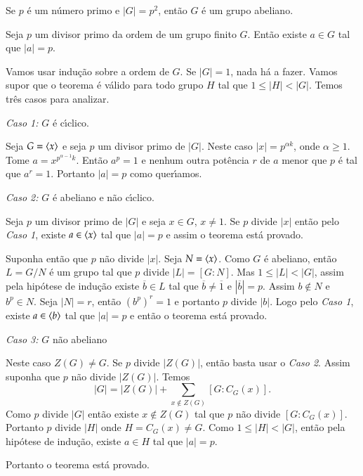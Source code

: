 \begin{corolario}
	Se $p$ \'e um n\'umero primo e $|G| = p^2$, ent\~ao $G$ \'e um grupo abeliano.
\end{corolario}

\begin{teorema}
	Seja $p$ um divisor primo da ordem de um grupo finito $G$. Ent\~ao existe $a \in G$ tal que $|a| = p$.
\end{teorema}
\begin{prova}
	Vamos usar indu\c{c}\~ao sobre a ordem de $G$. Se $|G| = 1$, nada h\'a a fazer. Vamos supor que o teorema \'e v\'alido para todo grupo $H$ tal que $1 \le |H| < |G|$. Temos tr\^es casos para analizar.
	
	\noindent \textit{Caso 1:} $G$ \'e c{\'\i}clico.

	Seja $G = \langle{x}\rangle$  e seja $p$ um divisor primo de $|G|$. Neste caso $|x| = p^{\alpha k}$, onde $\alpha \ge 1$. Tome $a = x^{p^{\alpha - 1}k}$. Ent\~ao $a^p = 1$ e nenhum outra pot\^encia $r$ de $a$ menor que $p$ \'e tal que $a^r = 1$. Portanto $|a| = p$ como quer{\'\i}amos.

	\noindent \textit{Caso 2:} $G$ \'e abeliano e n\~ao c{\'\i}clico.

	Seja $p$ um divisor primo de $|G|$ e seja $x \in G$, $x \ne 1$. Se $p$ divide $|x|$ ent\~ao pelo \textit{Caso 1}, existe $a \in \langle{x}\rangle$ tal que $|a| = p$ e assim o teorema est\'a provado.

	Suponha ent\~ao que $p$ n\~ao divide $|x|$. Seja $N = \langle{x}\rangle$. Como $G$ \'e abeliano, ent\~ao $L = G/N$ \'e um grupo tal que $p$ divide $|L| = [G : N]$. Mas $1 \le |L| < |G|$, assim pela hip\'otese de indu\c{c}\~ao existe $\overline{b} \in L$ tal que $\overline{b} \ne \overline{1}$ e $|\overline{b}| = p$. Assim $b \notin N$ e $b^p \in N$. Seja $|N| = r$, ent\~ao $(b^p)^r = 1$ e portanto $p$ divide $|b|$. Logo pelo \textit{Caso 1}, existe $a \in \langle{b}\rangle$ tal que $|a| = p$ e ent\~ao o teorema est\'a provado.

	\noindent \textit{Caso 3:} $G$ n\~ao abeliano

	Neste caso $Z(G) \ne G$. Se $p$ divide $|Z(G)|$, ent\~ao basta usar o \textit{Caso 2}. Assim suponha que $p$ n\~ao divide $|Z(G)|$. Temos
	\[
		|G| = |Z(G)| + \sum_{x \notin Z(G)}[G : C_G(x)].
	\]
	Como $p$ divide $|G|$ ent\~ao existe $x \notin Z(G)$ tal que $p$ n\~ao divide $[G : C_G(x)]$. Portanto $p$ divide $|H|$ onde $H = C_G(x) \ne G$. Como $1 \le |H| < |G|$, ent\~ao pela hip\'otese de indu\c{c}\~ao, existe $a \in H$ tal que $|a| = p$.

	Portanto o teorema est\'a provado.
\end{prova}

